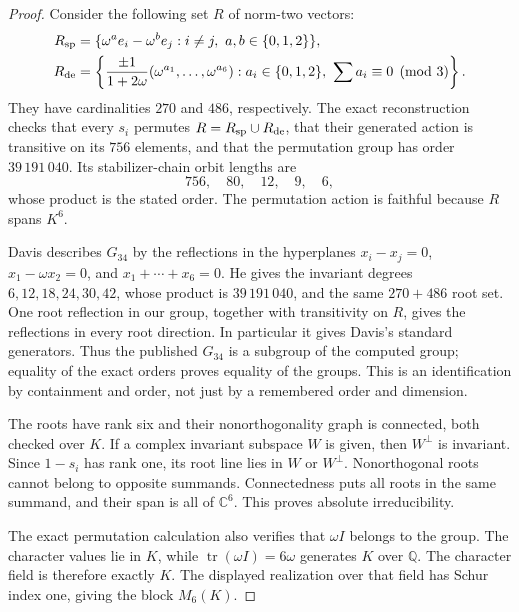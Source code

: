 \begin{proof}
Consider the following set \(R\) of norm-two vectors:
\[
\begin{split}
 R_{\rm sp}&=\{\omega^ae_i-\omega^be_j:
          i\ne j,\ a,b\in\{0,1,2\}\},\\
 R_{\rm de}&=\left\{\frac{\pm1}{1+2\omega}
       (\omega^{a_1},\ldots,\omega^{a_6}):
       a_i\in\{0,1,2\},\ \sum a_i\equiv0\pmod3\right\}.
\end{split}
\]
They have cardinalities \(270\) and \(486\), respectively.  The exact
reconstruction checks that every \(s_i\) permutes \(R=R_{\rm sp}\cup R_{\rm de}\),
that their generated action is transitive on its \(756\) elements, and that
the permutation group has order \(39\,191\,040\).  Its stabilizer-chain
orbit lengths are
\[
                   756,\quad80,\quad12,\quad9,\quad6,
\]
whose product is the stated order.  The permutation action is faithful because
\(R\) spans \(K^6\).

Davis \cite[Theorem 5.1 and its proof, pp.~312--313]{G34:Davis} describes
\(G_{34}\) by the reflections in the hyperplanes
\(x_i-x_j=0\), \(x_1-\omega x_2=0\), and
\(x_1+\cdots+x_6=0\).  He gives the invariant degrees
\(6,12,18,24,30,42\), whose product is \(39\,191\,040\), and the same
\(270+486\) root set.  One root reflection in our group, together with
transitivity on \(R\), gives the reflections in every root direction.  In
particular it gives Davis's standard generators.  Thus the published
\(G_{34}\) is a subgroup of the computed group; equality of the exact orders
proves equality of the groups.  This is an identification by containment and
order, not just by a remembered order and dimension.

The roots have rank six and their nonorthogonality graph is connected, both
checked over \(K\).  If a complex invariant subspace \(W\) is given, then
\(W^\perp\) is invariant.  Since \(1-s_i\) has rank one, its root line
lies in \(W\) or \(W^\perp\).  Nonorthogonal roots cannot belong to opposite
summands.  Connectedness puts all roots in the same summand, and their span
is all of \(\mathbb C^6\).  This proves absolute irreducibility.

The exact permutation calculation also verifies that \(\omega I\) belongs
to the group.  The character values lie in \(K\), while
\(\operatorname{tr}(\omega I)=6\omega\) generates \(K\) over \(\mathbb Q\).
The character field is therefore exactly \(K\).  The displayed realization
over that field has Schur index one, giving the block \(M_6(K)\).
\end{proof}

